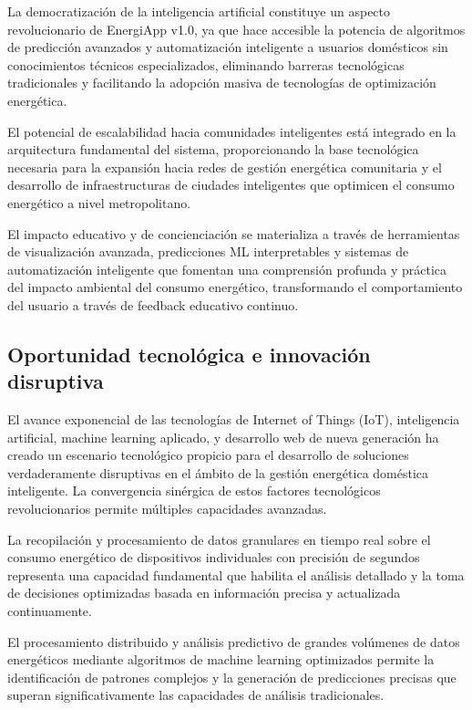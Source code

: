 La democratización de la inteligencia artificial constituye un aspecto revolucionario de EnergiApp v1.0, ya que hace accesible la potencia de algoritmos de predicción avanzados y automatización inteligente a usuarios domésticos sin conocimientos técnicos especializados, eliminando barreras tecnológicas tradicionales y facilitando la adopción masiva de tecnologías de optimización energética.

El potencial de escalabilidad hacia comunidades inteligentes está integrado en la arquitectura fundamental del sistema, proporcionando la base tecnológica necesaria para la expansión hacia redes de gestión energética comunitaria y el desarrollo de infraestructuras de ciudades inteligentes que optimicen el consumo energético a nivel metropolitano.

El impacto educativo y de concienciación se materializa a través de herramientas de visualización avanzada, predicciones ML interpretables y sistemas de automatización inteligente que fomentan una comprensión profunda y práctica del impacto ambiental del consumo energético, transformando el comportamiento del usuario a través de feedback educativo continuo.

\subsection{Oportunidad tecnológica e innovación disruptiva}

El avance exponencial de las tecnologías de Internet of Things (IoT), inteligencia artificial, machine learning aplicado, y desarrollo web de nueva generación ha creado un escenario tecnológico propicio para el desarrollo de soluciones verdaderamente disruptivas en el ámbito de la gestión energética doméstica inteligente. La convergencia sinérgica de estos factores tecnológicos revolucionarios permite múltiples capacidades avanzadas.

La recopilación y procesamiento de datos granulares en tiempo real sobre el consumo energético de dispositivos individuales con precisión de segundos representa una capacidad fundamental que habilita el análisis detallado y la toma de decisiones optimizadas basada en información precisa y actualizada continuamente.

El procesamiento distribuido y análisis predictivo de grandes volúmenes de datos energéticos mediante algoritmos de machine learning optimizados permite la identificación de patrones complejos y la generación de predicciones precisas que superan significativamente las capacidades de análisis tradicionales.


